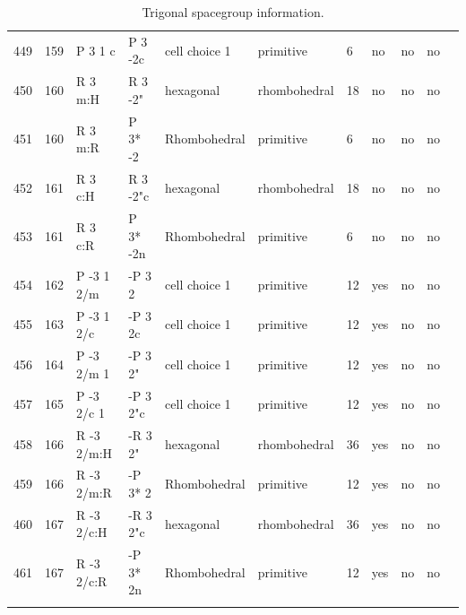 \begin{center}
\begin{small}
\begin{longtable}{|l|l|l|l|l|l|l|l|l|l|l|}
449 &159 &P 3 1 c &P 3 -2c &cell choice 1 &primitive &6 &no &no &no \\ 
450 &160 &R 3 m:H &R 3 -2" &hexagonal &rhombohedral &18 &no &no &no \\ 
451 &160 &R 3 m:R &P 3* -2 &Rhombohedral &primitive &6 &no &no &no \\ 
452 &161 &R 3 c:H &R 3 -2"c &hexagonal &rhombohedral &18 &no &no &no \\ 
453 &161 &R 3 c:R &P 3* -2n &Rhombohedral &primitive &6 &no &no &no \\ 
454 &162 &P -3 1 2/m &-P 3 2 &cell choice 1 &primitive &12 &yes &no &no \\ 
455 &163 &P -3 1 2/c &-P 3 2c &cell choice 1 &primitive &12 &yes &no &no \\ 
456 &164 &P -3 2/m 1 &-P 3 2" &cell choice 1 &primitive &12 &yes &no &no \\ 
457 &165 &P -3 2/c 1 &-P 3 2"c &cell choice 1 &primitive &12 &yes &no &no \\ 
458 &166 &R -3 2/m:H &-R 3 2" &hexagonal &rhombohedral &36 &yes &no &no \\ 
459 &166 &R -3 2/m:R &-P 3* 2 &Rhombohedral &primitive &12 &yes &no &no \\ 
460 &167 &R -3 2/c:H &-R 3 2"c &hexagonal &rhombohedral &36 &yes &no &no \\ 
461 &167 &R -3 2/c:R &-P 3* 2n &Rhombohedral &primitive &12 &yes &no &no \\ 
\hline
\caption{Trigonal spacegroup information.}
\end{longtable}


\end{small}
\end{center}
